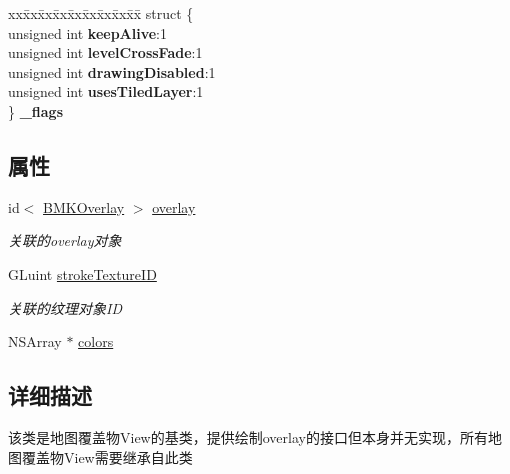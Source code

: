 \begin{DoxyCompactItemize}
\item 
\hypertarget{interface_b_m_k_overlay_view_a1b29250fea696a6c7317fe55b0ffe0f5}{}\begin{tabbing}
xx\=xx\=xx\=xx\=xx\=xx\=xx\=xx\=xx\=\kill
struct \{\\
\>unsigned int {\bfseries keepAlive}:1\\
\>unsigned int {\bfseries levelCrossFade}:1\\
\>unsigned int {\bfseries drawingDisabled}:1\\
\>unsigned int {\bfseries usesTiledLayer}:1\\
\} {\bfseries \_flags}\label{interface_b_m_k_overlay_view_a1b29250fea696a6c7317fe55b0ffe0f5}
\\

\end{tabbing}\end{DoxyCompactItemize}
\subsection*{属性}
\begin{DoxyCompactItemize}
\item 
\hypertarget{interface_b_m_k_overlay_view_a0824b78460b0c199376680c7c335d562}{}id$<$ \hyperlink{protocol_b_m_k_overlay-p}{B\+M\+K\+Overlay} $>$ \hyperlink{interface_b_m_k_overlay_view_a0824b78460b0c199376680c7c335d562}{overlay}\label{interface_b_m_k_overlay_view_a0824b78460b0c199376680c7c335d562}

\begin{DoxyCompactList}\small\item\em 关联的overlay对象 \end{DoxyCompactList}\item 
\hypertarget{interface_b_m_k_overlay_view_a160ee62c460e1fa87ccd588f8024e1a9}{}G\+Luint \hyperlink{interface_b_m_k_overlay_view_a160ee62c460e1fa87ccd588f8024e1a9}{stroke\+Texture\+I\+D}\label{interface_b_m_k_overlay_view_a160ee62c460e1fa87ccd588f8024e1a9}

\begin{DoxyCompactList}\small\item\em 关联的纹理对象\+I\+D \end{DoxyCompactList}\item 
N\+S\+Array $\ast$ \hyperlink{interface_b_m_k_overlay_view_ac52154ebab33c7f35362a1734eecbaee}{colors}
\end{DoxyCompactItemize}


\subsection{详细描述}
该类是地图覆盖物\+View的基类，提供绘制overlay的接口但本身并无实现，所有地图覆盖物\+View需要继承自此类 

